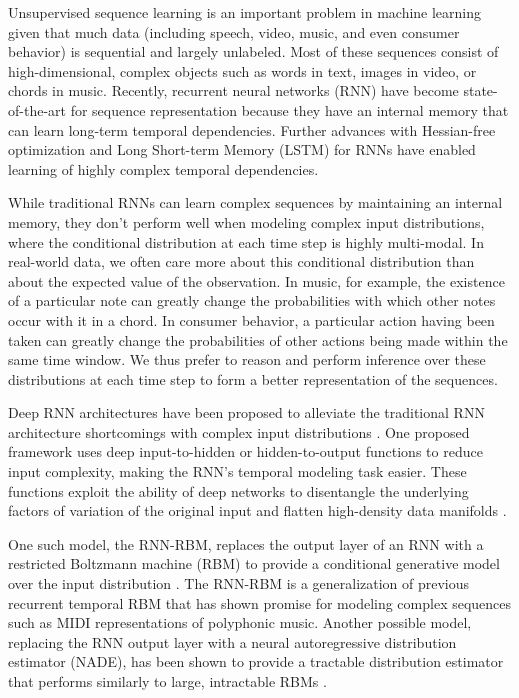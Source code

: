 Unsupervised sequence learning is an important problem in machine learning given that much data (including speech, video,  music, and even consumer behavior) is sequential and largely unlabeled. Most of these sequences consist of high-dimensional, complex objects such as words in text, images in video, or chords in music. Recently, recurrent neural networks (RNN) \cite{rnn} have become state-of-the-art for sequence representation because they have an internal memory that can learn long-term temporal dependencies. Further advances with Hessian-free optimization and Long Short-term Memory (LSTM) for RNNs \cite{hessian_free, lstm} have enabled learning of highly complex temporal dependencies.

While traditional RNNs can learn complex sequences by maintaining an internal memory, they don't perform well when modeling complex input distributions, where the conditional distribution at each time step is highly multi-modal. In real-world data, we often care more about this conditional distribution than about the expected value of the observation. In music, for example, the existence of a particular note can greatly change the probabilities with which other notes occur with it in a chord. In consumer behavior, a particular action having been taken can greatly change the probabilities of other actions being made within the same time window. We thus prefer to reason and perform inference over these distributions at each time step to form a better representation of the sequences.

Deep RNN architectures have been proposed to alleviate the traditional RNN architecture shortcomings with complex input distributions \cite{deep_rnn}. One proposed framework uses deep input-to-hidden or hidden-to-output functions to reduce input complexity, making the RNN's temporal modeling task easier. These functions exploit the ability of deep networks to disentangle the underlying factors of variation of the original input and flatten high-density data manifolds \cite{goodfellow09, glorot11, bengio13}.

One such model, the RNN-RBM, replaces the output layer of an RNN with a restricted Boltzmann machine (RBM) to provide a conditional generative model over the input distribution \cite{rnnrbm,boulanger14}. The RNN-RBM is a generalization of previous recurrent temporal RBM \cite{rtrbm} that has shown promise for modeling complex sequences such as MIDI representations of polyphonic music. Another possible model, replacing the RNN output layer with a neural autoregressive distribution estimator (NADE),  has been shown to provide a tractable distribution estimator that performs similarly to large, intractable RBMs \cite{nade}.

